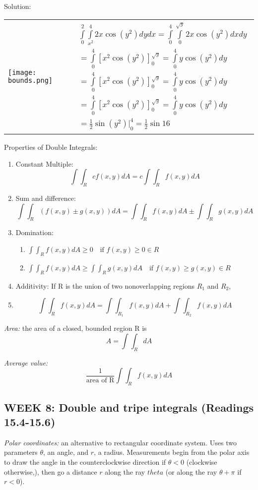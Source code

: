 \documentclass[12pt]{article}
\begin{document}
Solution:

\begin{tabular}{l r}
    \parbox{8cm}{\texttt{[image: bounds.png]}}
    &
    \parbox{5cm}{
        \begin{align*}
            &\int\limits_0^2 \int\limits_{x^2}^4 2x \cos (y^2) dy dx = \int\limits_0^4 \int\limits_0^{\sqrt{y}} 2x \cos (y^2) dx dy\\
            &= \int\limits_0^4 \left[x^2 \cos(y^2)\right]_0^{\sqrt{y}} = \int\limits_0^4 y \cos(y^2) dy\\
            &= \int\limits_0^4 \left[x^2 \cos(y^2)\right]_0^{\sqrt{y}}= \int\limits_0^4 y \cos(y^2) dy\\
            &= \int\limits_0^4 \left[x^2 \cos(y^2)\right]_0^{\sqrt{y}}= \int\limits_0^4 y \cos(y^2) dy\\
            &= \frac{1}{2} \sin(y^2) \big|_0^4 = \frac{1}{2} \sin 16
        \end{align*}
    }
\end{tabular}

Properties of Double Integrals:
\begin{enumerate}
    \item Constant Multiple:
    \[\int \int_R cf(x,y) dA = c\int \int_R f(x,y) dA\]
    \item Sum and difference:
    \[\int \int_R (f(x,y) \pm g(x,y)) dA = \int \int_R f(x,y) dA \pm \int \int_R g(x,y) dA\]
    \item Domination:
    \begin{enumerate}
        \item $\int \int_R f(x,y) dA \geq 0 \quad \text{if } f(x,y) \geq 0 \in R$
        \item $\int \int_R f(x,y) dA \geq \int \int_R g(x,y) dA \quad \text{if } f(x,y) \geq g(x,y) \in R$
    \end{enumerate}
    \item Additivity: If R is the union of two nonoverlapping regions $R_1$ and $R_2$,
    \item \[\int \int_R f(x,y) dA = \int \int_{R_1} f(x,y) dA + \int \int_{R_2} f(x,y) dA\]
\end{enumerate}

\emph{Area:} the area of a closed, bounded region R is 
\[A = \int \int_R dA\]

\emph{Average value:}
\[\frac{1}{\text{area of R}} \int \int_R f(x,y) dA\]
\subsection{WEEK 8: Double and tripe integrals (Readings 15.4-15.6)}
\emph{Polar coordinates:} an alternative to rectangular coordinate system. Uses two parameters $\theta$, an angle, and $r$, a radius. Measurements begin from the polar axis to draw the angle in the counterclockwise direction if $\theta < 0$ (clockwise otherwise,), then go a distance $r$ along the ray $theta$ (or along the ray $\theta + \pi$ if $r < 0$).
\end{document}
